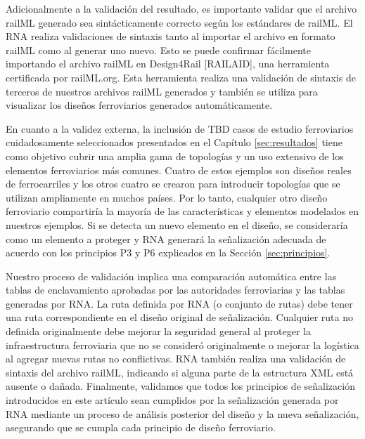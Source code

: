     Adicionalmente a la validación del resultado, es importante validar que el archivo railML generado sea sintácticamente correcto según los estándares de railML. El RNA realiza validaciones de sintaxis tanto al importar el archivo en formato railML como al generar uno nuevo. Esto se puede confirmar fácilmente importando el archivo railML en Design4Rail [RAILAID], una herramienta certificada por railML.org. Esta herramienta realiza una validación de sintaxis de terceros de nuestros archivos railML generados y también se utiliza para visualizar los diseños ferroviarios generados automáticamente.

    En cuanto a la validez externa, la inclusión de TBD casos de estudio ferroviarios cuidadosamente seleccionados presentados en el Capítulo  \ref{sec:resultados} tiene como objetivo cubrir una amplia gama de topologías y un uso extensivo de los elementos ferroviarios más comunes. Cuatro de estos ejemplos son diseños reales de ferrocarriles y los otros cuatro se crearon para introducir topologías que se utilizan ampliamente en muchos países. Por lo tanto, cualquier otro diseño ferroviario compartiría la mayoría de las características y elementos modelados en nuestros ejemplos. Si se detecta un nuevo elemento en el diseño, se consideraría como un elemento a proteger y RNA generará la señalización adecuada de acuerdo con los principios P3 y P6 explicados en la Sección \ref{sec:principios}.

    Nuestro proceso de validación implica una comparación automática entre las tablas de enclavamiento aprobadas por las autoridades ferroviarias y las tablas generadas por RNA. La ruta definida por RNA (o conjunto de rutas) debe tener una ruta correspondiente en el diseño original de señalización. Cualquier ruta no definida originalmente debe mejorar la seguridad general al proteger la infraestructura ferroviaria que no se consideró originalmente o mejorar la logística al agregar nuevas rutas no conflictivas. RNA también realiza una validación de sintaxis del archivo railML, indicando si alguna parte de la estructura XML está ausente o dañada. Finalmente, validamos que todos los principios de señalización introducidos en este artículo sean cumplidos por la señalización generada por RNA mediante un proceso de análisis posterior del diseño y la nueva señalización, asegurando que se cumpla cada principio de diseño ferroviario.